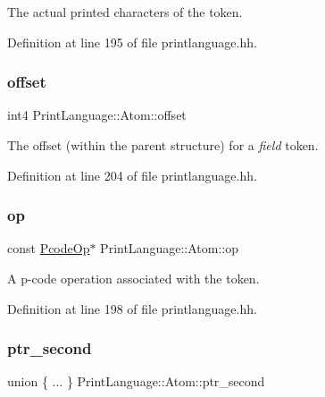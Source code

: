 The actual printed characters of the token. 



Definition at line 195 of file printlanguage.\+hh.

\mbox{\label{struct_print_language_1_1_atom_a28454691b4629928d3b57d3a2f80265d}} 
\subsubsection{\texorpdfstring{offset}{offset}}
{\footnotesize\ttfamily int4 Print\+Language\+::\+Atom\+::offset}



The offset (within the parent structure) for a {\itshape field} token. 



Definition at line 204 of file printlanguage.\+hh.

\mbox{\label{struct_print_language_1_1_atom_a65bc578109e6142a7a88b992f409093a}} 
\subsubsection{\texorpdfstring{op}{op}}
{\footnotesize\ttfamily const \mbox{\hyperlink{class_pcode_op}{Pcode\+Op}}$\ast$ Print\+Language\+::\+Atom\+::op}



A p-\/code operation associated with the token. 



Definition at line 198 of file printlanguage.\+hh.

\mbox{\label{struct_print_language_1_1_atom_a1b69a38395efd1a84cc657cd0eea5cba}} 
\subsubsection{\texorpdfstring{ptr\_second}{ptr\_second}}
{\footnotesize\ttfamily union \{ ... \}   Print\+Language\+::\+Atom\+::ptr\+\_\+second}



